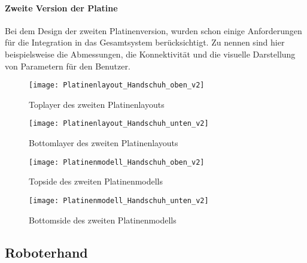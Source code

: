 \documentclass[titlepage,12pt,twoside]{article}
\begin{document}
\paragraph{Zweite Version der Platine}
\hfill \break
\hfill \break
Bei dem Design der zweiten Platinenversion, wurden schon einige Anforderungen für die Integration in das Gesamtsystem
berücksichtigt. Zu nennen sind hier beispielsweise die Abmessungen, die Konnektivität und die visuelle Darstellung 
von Parametern für den Benutzer. 

\begin{figure}[H]
	\begin{center}
		\scalebox{0.8}
		{\texttt{[image: Platinenlayout\_Handschuh\_oben\_v2]}}
		\caption{Toplayer des zweiten Platinenlayouts}
		\label{fig:Platinenlayout_Handschuh_oben_v2}		
	\end{center}
\end{figure}
\hfill \break

\begin{figure}[H]
	\begin{center}
		\scalebox{0.8}
		{\texttt{[image: Platinenlayout\_Handschuh\_unten\_v2]}}
		\caption{Bottomlayer des zweiten Platinenlayouts}
		\label{fig:Platinenlayout_Handschuh_unten_v2}		
	\end{center}
\end{figure}
\hfill \break

\begin{figure}[H]
	\begin{center}
		\scalebox{0.8}
		{\texttt{[image: Platinenmodell\_Handschuh\_oben\_v2]}}
		\caption{Topside des zweiten Platinenmodells}
		\label{fig:Platinenmodell_Handschuh_oben_v2}		
	\end{center}
\end{figure}
\hfill \break

\begin{figure}[H]
	\begin{center}
		\scalebox{0.8}
		{\texttt{[image: Platinenmodell\_Handschuh\_unten\_v2]}}
		\caption{Bottomside des zweiten Platinenmodells}
		\label{fig:Platinenmodell_Handschuh_unten_v2}		
	\end{center}
\end{figure}
\hfill \break



\subsection{Roboterhand}
\end{document}
